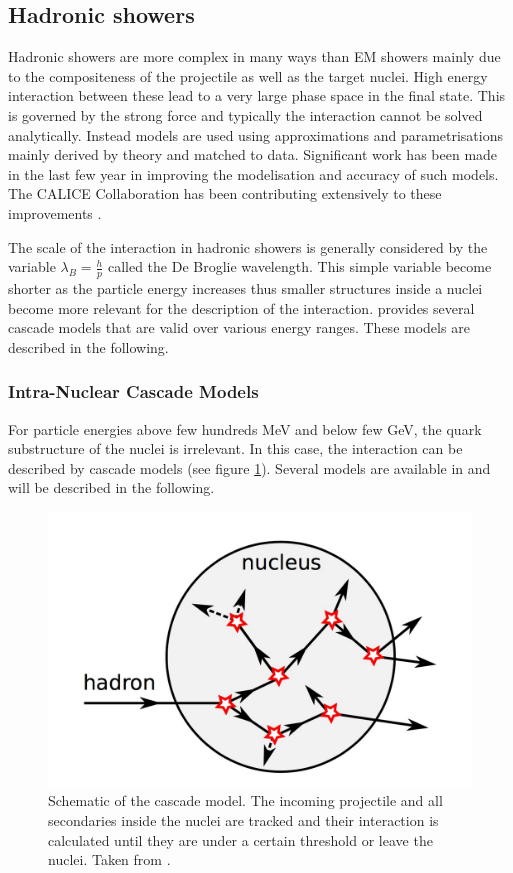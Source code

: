 \subsection{Hadronic showers}

Hadronic showers are more complex in many ways than EM showers mainly due to the compositeness of the projectile as well as the target nuclei. High energy interaction between these lead to a very large phase space in the final state. This is governed by the strong force and typically the interaction cannot be solved analytically. Instead models are used using approximations and parametrisations mainly derived by theory and matched to data. Significant work has been made in the last few year in improving the modelisation and accuracy of such models. The CALICE Collaboration has been contributing extensively to these improvements \cite{Adloff2013, Bilki2015}.

The scale of the interaction in hadronic showers is generally considered by the variable $\lambda_{B} = \frac{h}{p}$ called the De Broglie wavelength. This simple variable become shorter as the particle energy increases thus smaller structures inside a nuclei become more relevant for the description of the interaction. \geant provides several cascade models that are valid over various energy ranges. These models are described in the following.

\subsubsection{Intra-Nuclear Cascade Models}

For particle energies above few hundreds MeV and below few GeV, the quark substructure of the nuclei is irrelevant. In this case, the interaction can be described by cascade models (see figure \ref{fig:cascademodel}). Several models are available in \geant and will be described in the following.\\

\begin{figure}[htbp!]
  \centering
  \includegraphics[width=0.5\linewidth]{chap4/fig/CascadeModel.jpeg}
  \caption{Schematic of the cascade model. The incoming projectile and all secondaries inside the nuclei are tracked and their interaction is calculated until they are under a certain threshold or leave the nuclei. Taken from \cite{Feege2011}.} \label{fig:cascademodel}
\end{figure}

